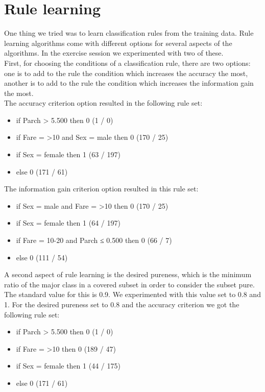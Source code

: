 \documentclass[12pt,a4paper]{article}
\begin{document}
\section{Rule learning}
One thing we tried was to learn classification rules from the training data.
Rule learning algorithms come with different options for several aspects of the algorithms. In the exercise session we experimented with two of these.\\
First, for choosing the conditions of a classification rule, there are two options: one is to add to the rule the condition which increases the accuracy the most, another is to add to the rule the condition which increases the information gain the most.\\
The accuracy criterion option resulted in the following rule set:
\begin{itemize}

\item if Parch > 5.500 then 0  (1 / 0)
\item if Fare = >10 and Sex = male then 0  (170 / 25)
\item if Sex = female then 1  (63 / 197)
\item else 0  (171 / 61)

\end{itemize}
The information gain criterion option resulted in this rule set:
\begin{itemize}

\item if Sex = male and Fare = >10 then 0  (170 / 25)
\item if Sex = female then 1  (64 / 197)
\item if Fare = 10-20 and Parch ≤ 0.500 then 0  (66 / 7)
\item else 0  (111 / 54)

\end{itemize}
A second aspect of rule learning is the desired pureness, which is the minimum ratio of the major class in a covered subset in order to consider the subset pure. The standard value for this is 0.9. We experimented with this value set to 0.8 and 1.
For the desired pureness set to 0.8 and the accuracy criterion we got the following rule set:
\begin{itemize}

\item if Parch > 5.500 then 0  (1 / 0)
\item if Fare = >10 then 0  (189 / 47)
\item if Sex = female then 1  (44 / 175)
\item else 0  (171 / 61)

\end{itemize}
\end{document}
